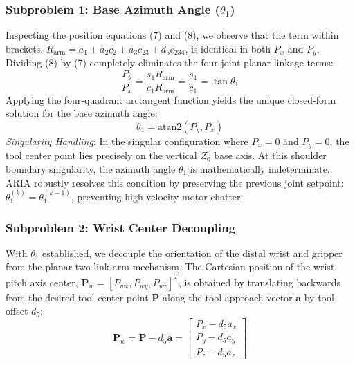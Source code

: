 \documentclass[journal]{IEEEtran}
\begin{document}
\subsubsection{Subproblem 1: Base Azimuth Angle ($\theta_1$)}
Inspecting the position equations (7) and (8), we observe that the term within brackets, $R_{\text{arm}} = a_1 + a_2 c_2 + a_3 c_{23} + d_5 c_{234}$, is identical in both $P_x$ and $P_y$. Dividing (8) by (7) completely eliminates the four-joint planar linkage terms:
\begin{equation}
\frac{P_y}{P_x} = \frac{s_1 R_{\text{arm}}}{c_1 R_{\text{arm}}} = \frac{s_1}{c_1} = \tan\theta_1
\end{equation}
Applying the four-quadrant arctangent function yields the unique closed-form solution for the base azimuth angle:
\begin{equation}
\theta_1 = \text{atan2}(P_y, P_x)
\end{equation}
\textit{Singularity Handling}: In the singular configuration where $P_x = 0$ and $P_y = 0$, the tool center point lies precisely on the vertical $Z_0$ base axis. At this shoulder boundary singularity, the azimuth angle $\theta_1$ is mathematically indeterminate. ARIA robustly resolves this condition by preserving the previous joint setpoint: $\theta_1^{(k)} = \theta_1^{(k-1)}$, preventing high-velocity motor chatter.

\subsubsection{Subproblem 2: Wrist Center Decoupling}
With $\theta_1$ established, we decouple the orientation of the distal wrist and gripper from the planar two-link arm mechanism. The Cartesian position of the wrist pitch axis center, $\mathbf{P}_w = [P_{wx}, P_{wy}, P_{wz}]^T$, is obtained by translating backwards from the desired tool center point $\mathbf{P}$ along the tool approach vector $\mathbf{a}$ by tool offset $d_5$:
\begin{equation}
\mathbf{P}_w = \mathbf{P} - d_5 \mathbf{a} = \begin{bmatrix}
P_x - d_5 a_x \\
P_y - d_5 a_y \\
P_z - d_5 a_z
\end{bmatrix}
\end{equation}
\end{document}
